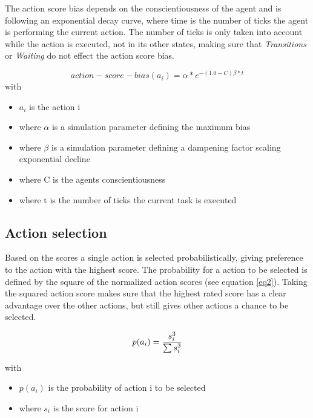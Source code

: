 \bb

The action score bias depends on the conscientiousness of the agent and is following an
exponential decay curve, where time is the number of ticks the agent is performing
the current action. The number of ticks is only taken into account while the action is executed,
not in its other states, making sure that \textit{Transitions} or \textit{Waiting}
do not effect the action score bias.

\begin{equation}
    \label{eq1}
    action-score-bias(a_i) = \alpha * e^{-(1.0 - C) \beta * t}
\end{equation}
with
\begin{itemize}
    \item $a_i$ is the action i
    \item where $\alpha$ is a simulation parameter defining the maximum bias
    \item where $\beta$ is a simulation parameter defining a dampening factor scaling exponential decline
    \item where C is the agents conscientiousness
    \item where t is the number of ticks the current task is executed
\end{itemize}

\subsection{Action selection}
Based on the scores a single action is selected probabilistically, giving preference
to the action with the highest score.
The probability for a action to be selected is defined by the square of the normalized
action scores (see equation \ref{eq2}). Taking the squared action score makes sure
that the highest rated score has a clear advantage over the other actions, but still
gives other actions a chance to be selected.

\begin{equation}
    \label{eq2}
    p(a_i) = \frac{s_i^3}{\sum s_i^3} \\
\end{equation}

with
\begin{itemize}
    \item $p(a_i)$ is the probability of action i to be selected
    \item where $s_i$ is the score for action i
\end{itemize}


